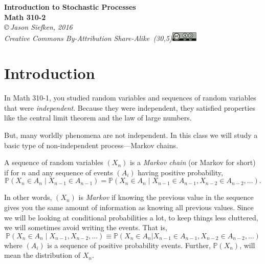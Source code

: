 \documentclass{problemset}
\renewcommand{\P}{\mathbb{P}}
\begin{document}
\pagestyle{fancy}
\renewcommand{\headrulewidth}{0pt}

\begin{center}
	{\huge\bf Introduction to Stochastic Processes \\{\sc Math 310-2}}\\

\vspace{.7in}
{
\it \copyright\,Jason Siefken, 2016 \\
Creative Commons By-Attribution Share-Alike\, \makebox(30,5){\includegraphics[height=1.2em]{by-sa.pdf}}
}
\end{center}

\section*{Introduction}


	In Math 310-1, you studied random variables and sequences of random variables that
	were \emph{independent}.  Because they were independent, they satisfied properties like 
	the central limit theorem and the law of large numbers.

	But, many worldly phenomena are not independent.  In this class
	we will study a basic type of non-independent process---Markov chains.

	\begin{definition}
		A sequence of random variables $(X_n)$ is a \emph{Markov chain} (or
		Markov for short) if for $n$ and any sequence of events $(A_i)$ having positive
		probability,
		\[
			\P(X_n\in A_n \mid X_{n-1}\in A_{n-1}) = \P(X_n\in A_n\mid X_{n-1}\in A_{n-1},X_{n-2}\in A_{n-2},\ldots).
		\]
	\end{definition}

	In other words, $(X_n)$ is \emph{Markov} if knowing the previous value in the sequence
	gives you the same amount of information as knowing all previous values.  Since we will be looking
	at conditional probabilities a lot, to keep things less cluttered, we will sometimes
	avoid writing the events.  That is,
	\[
		\P(X_n\in A_n\mid X_{n-1}, X_{n-2},\ldots) \equiv \P(X_n\in A_n| X_{n-1}\in A_{n-1}, X_{n-2}\in A_{n-2},\ldots)
	\]
	where $(A_i)$ is a sequence of positive probability events.  Further, $\P(X_n)$, will mean the distribution of $X_n$.
\end{document}
